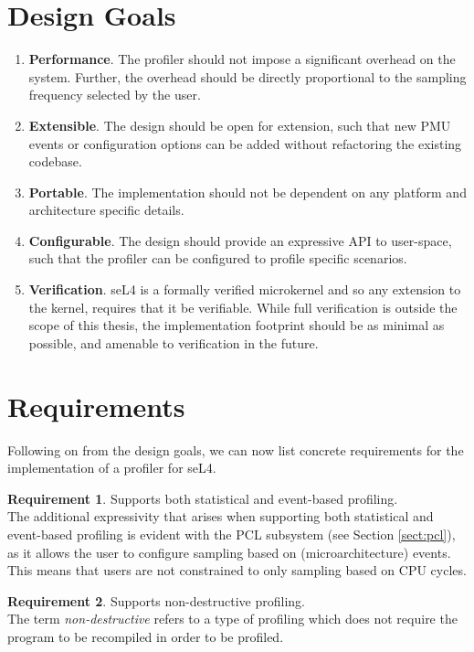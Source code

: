 \section{Design Goals}

\ssp\begin{enumerate}
    \item \textbf{Performance}. The profiler should not impose a significant overhead on the system. Further, the overhead should be directly proportional to the sampling frequency selected by the user.
    \item \textbf{Extensible}. The design should be open for extension, such that new PMU events or configuration options can be added without refactoring the existing codebase. 
    \item \textbf{Portable}. The implementation should not be dependent on any platform and architecture specific details.
    \item \textbf{Configurable}. The design should provide an expressive API to user-space, such that the profiler can be configured to profile specific scenarios. 
    \item \textbf{Verification}. seL4 is a formally verified microkernel and so any extension to the kernel, requires that it be verifiable. While full verification is outside the scope of this thesis, the implementation footprint should be as minimal as possible, and amenable to verification in the future.
\end{enumerate}\dsp

\section{Requirements}

Following on from the design goals, we can now list concrete requirements for the implementation of a profiler for seL4.

\textbf{Requirement 1}. Supports both statistical and event-based profiling.\\
The additional expressivity that arises when supporting both statistical and event-based profiling is evident with the PCL subsystem (see Section \ref{sect:pcl}), as it allows the user to configure sampling based on (microarchitecture) events. This means that users are not constrained to only sampling based on CPU cycles.

\textbf{Requirement 2}. Supports non-destructive profiling.\\
The term \textit{non-destructive} refers to a type of profiling which does not require the program to be recompiled in order to be profiled. 

